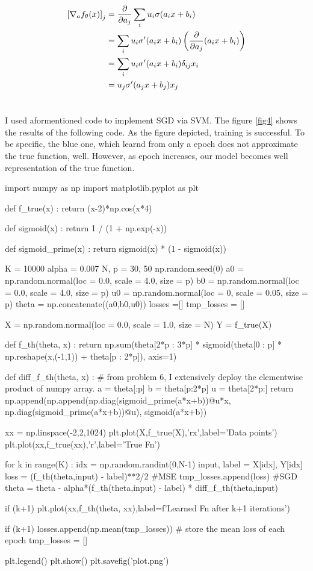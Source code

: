 \documentclass[10pt]{article}
\begin{document}
\begin{align*}
    \left[\nabla_a f_\theta(x)\right]_j &= {\partial \over \partial a_j} \sum_i u_i \sigma(a_ix + b_i) \\
    &= \sum_i u_i \sigma^\prime(a_ix + b_i)\left({\partial \over \partial a_j} (a_ix + b_i)\right) \\
    &= \sum_i u_i \sigma^\prime(a_ix + b_i)\delta_{ij}x_i\\
    &= u_j \sigma^\prime(a_jx + b_j)x_j
\end{align*}

\section{}
I used aformentioned code to implement SGD via SVM. The figure \ref{fig4} shows the results of the following code. As the figure depicted, training is successful. To be specific, the blue one, which learnd from only a epoch does not approximate the true function, well. However, as epoch increases, our model becomes well representation of the true function.  
\begin{python}
import numpy as np
import matplotlib.pyplot as plt

def f_true(x) :
    return (x-2)*np.cos(x*4)

def sigmoid(x) :
    return 1 / (1 + np.exp(-x))

def sigmoid_prime(x) :
    return sigmoid(x) * (1 - sigmoid(x))

K = 10000
alpha = 0.007
N, p = 30, 50
np.random.seed(0)
a0 = np.random.normal(loc = 0.0, scale = 4.0, size = p)
b0 = np.random.normal(loc = 0.0, scale = 4.0, size = p)
u0 = np.random.normal(loc = 0, scale = 0.05, size = p)
theta = np.concatenate((a0,b0,u0))
losses =[]
tmp_losses = []

X = np.random.normal(loc = 0.0, scale = 1.0, size = N)
Y = f_true(X)

def f_th(theta, x) :
    return np.sum(theta[2*p : 3*p] * sigmoid(theta[0 : p] * np.reshape(x,(-1,1)) + theta[p : 2*p]), axis=1)

def diff_f_th(theta, x) : # from problem 6, I extensively deploy the elementwise product of numpy array.
    a = theta[:p]
    b = theta[p:2*p]
    u = theta[2*p:]
    return np.append(np.append(np.diag(sigmoid_prime(a*x+b))@u*x, np.diag(sigmoid_prime(a*x+b))@u), sigmoid(a*x+b))

xx = np.linspace(-2,2,1024)
plt.plot(X,f_true(X),'rx',label='Data points')
plt.plot(xx,f_true(xx),'r',label='True Fn')

for k in range(K) :
    idx = np.random.randint(0,N-1)
    input, label = X[idx], Y[idx]
    loss = (f_th(theta,input) - label)**2/2 #MSE
    tmp_losses.append(loss)
    #SGD
    theta = theta - alpha*(f_th(theta,input) - label) * diff_f_th(theta,input)
    
    if (k+1)%
        plt.plot(xx,f_th(theta, xx),label=f'Learned Fn after {k+1} iterations')

    if (k+1)%
        losses.append(np.mean(tmp_losses)) # store the mean loss of each epoch
        tmp_losses = []

plt.legend()
plt.show()
plt.savefig('plot.png')
\end{python}
\end{document}
